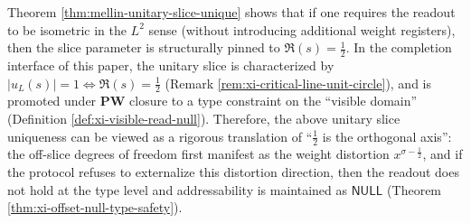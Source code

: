 \begin{remark}\label{rem:mellin-unitary-slice-semantic-alignment}
Theorem \ref{thm:mellin-unitary-slice-unique} shows that if one requires the readout to be isometric in the \(L^{2}\) sense (without introducing additional weight registers), then the slice parameter is structurally pinned to \(\Re(s)=\tfrac12\).
In the completion interface of this paper, the unitary slice is characterized by \(|u_{L}(s)|=1\iff \Re(s)=\tfrac12\) (Remark \ref{rem:xi-critical-line-unit-circle}), and is promoted under \(\mathbf{PW}\) closure to a type constraint on the ``visible domain'' (Definition \ref{def:xi-visible-read-null}).
Therefore, the above unitary slice uniqueness can be viewed as a rigorous translation of ``\(\tfrac12\) is the orthogonal axis'': the off-slice degrees of freedom first manifest as the weight distortion \(x^{\sigma-\frac12}\), and if the protocol refuses to externalize this distortion direction, then the readout does not hold at the type level and addressability is maintained as \(\mathsf{NULL}\) (Theorem \ref{thm:xi-offset-null-type-safety}).
\end{remark}

\endinput
